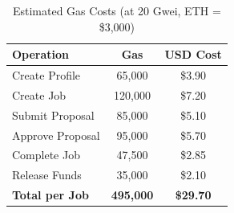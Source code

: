 \begin{table}[H]
\centering
\caption{Estimated Gas Costs (at 20 Gwei, ETH = \$3,000)}
\begin{tabular}{|l|c|c|}
\hline
\textbf{Operation} & \textbf{Gas} & \textbf{USD Cost} \\
\hline
Create Profile & 65,000 & \$3.90 \\
\hline
Create Job & 120,000 & \$7.20 \\
\hline
Submit Proposal & 85,000 & \$5.10 \\
\hline
Approve Proposal & 95,000 & \$5.70 \\
\hline
Complete Job & 47,500 & \$2.85 \\
\hline
Release Funds & 35,000 & \$2.10 \\
\hline
\textbf{Total per Job} & \textbf{495,000} & \textbf{\$29.70} \\
\hline
\end{tabular}
\end{table}